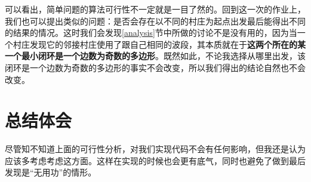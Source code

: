 \documentclass[UTF8]{ctexart}
\begin{document}
 	\indent 可以看出，简单问题的算法可行性不一定就是一目了然的。回到这一次的作业上，我们也可以提出类似的问题：\textcolor[rgb]{1,0,0}{是否会存在以不同的村庄为起点出发最后能得出不同的结果的情况}。这时我们会发现\ref{analysis}节中所做的讨论不是没有用的，因为当一个村庄发现它的邻接村庄使用了跟自己相同的波段，其本质就在于\textbf{这两个所在的某一个最小闭环是一个边数为奇数的多边形}。既然如此，不论我选择从哪里出发，该闭环是一个边数为奇数的多边形的事实不会改变，所以我们得出的结论自然也不会改变。

	\section{总结体会}
		\indent 尽管知不知道上面的可行性分析，对我们实现代码不会有任何影响，但我还是认为应该多考虑考虑这方面。这样在实现的时候也会更有底气，同时也避免了做到最后发现是“无用功”的情形。

%
\end{document}
